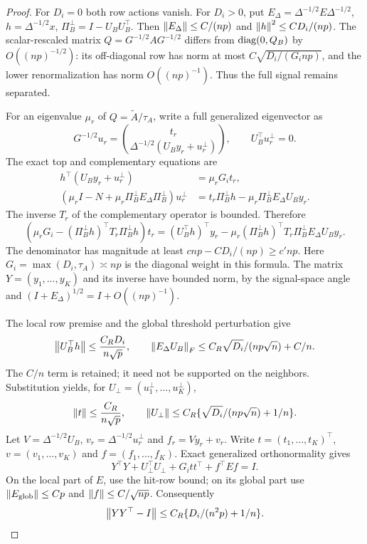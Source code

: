 \begin{proof}
For $D_i=0$ both row actions vanish. For $D_i>0$, put
$E_\Delta=\Delta^{-1/2}E\Delta^{-1/2}$, $h=\Delta^{-1/2}x$,
$\Pi_B^\perp=I-U_BU_B^\top$. Then $\left\lVert E_\Delta\right\rVert\le C/(np)$ and
$\left\lVert h\right\rVert^2\le CD_i/(np)$. The scalar-rescaled matrix $Q=G^{-1/2}AG^{-1/2}$ differs from
$\operatorname{diag}(0,Q_B)$ by $O({(np)}^{-1/2})$: its off-diagonal row has norm
at most $C\sqrt{D_i/(G_i{np})}$, and the lower renormalization has norm
$O({(np)}^{-1})$. Thus the full signal remains separated.

For an eigenvalue $\mu_r$ of $Q=\widetilde A/\tau_A$, write a full
generalized eigenvector as
\[
 G^{-1/2}u_r=\binom{t_r}{\Delta^{-1/2}(U_By_r+u_r^\perp)},
 \qquad U_B^\top u_r^\perp=0.
\]
The exact top and complementary equations are
\begin{align*}
 h^\top(U_By_r+u_r^\perp)&=\mu_r G_i t_r,\\
 (\mu_rI-N+\mu_r\Pi_B^\perp E_\Delta \Pi_B^\perp)u_r^\perp
   &=t_r\Pi_B^\perp h-\mu_r\Pi_B^\perp E_\Delta U_By_r.
\end{align*}
The inverse $T_r$ of the complementary operator is bounded. Therefore
\[
 (\mu_r G_i-(\Pi_B^\perp h)^\top T_r\Pi_B^\perp h)t_r
  =(U_B^\top h)^\top y_r
       -\mu_r(\Pi_B^\perp h)^\top T_r\Pi_B^\perp E_\Delta U_By_r.
\]
The denominator has magnitude at least $c{np}-CD_i/(np)\ge c'{np}$.
Here $G_i=\max(D_i,\tau_A)\asymp {np}$ is the diagonal weight in this formula.
The matrix $Y=(y_1,\ldots,y_K)$ and its inverse have bounded norm,
by the signal-space angle and $(I+E_\Delta)^{1/2}=I+O({(np)}^{-1})$.

The local row premise and the global threshold perturbation give
\[
 \left\lVert U_B^\top h\right\rVert\le \frac{C_RD_i}{n\sqrt p},\qquad
 \left\lVert E_\Delta U_B\right\rVert_F\le C_R\sqrt{D_i}/({np}\sqrt n)+C/n.
\]
The $C/n$ term is retained; it need not be supported on the neighbors.
Substitution yields, for $U_\perp=(u_1^\perp,\ldots,u_K^\perp)$,
\begin{equation}\label{restore:loo-refined}
 \left\lVert t\right\rVert\le \frac{C_R}{n\sqrt p},\qquad
 \left\lVert U_\perp\right\rVert\le C_R\{\sqrt{D_i}/({np}\sqrt n)+1/n\}.
\end{equation}
Let $V=\Delta^{-1/2}U_B$, $v_r=\Delta^{-1/2}u_r^\perp$ and
$f_r=Vy_r+v_r$. Write $t=(t_1,\ldots,t_K)^\top$, 
$v=(v_1,\ldots,v_K)$ and $f=(f_1,\ldots,f_K)$. Exact generalized orthonormality gives
\[
 Y^\top Y+U_\perp^\top U_\perp+G_i tt^\top+f^\top Ef=I.
\]
On the local part of $E$, use the hit-row bound; on its global part
use $\left\lVert E_\mathrm{glob}\right\rVert\le Cp$ and
$\left\lVert f\right\rVert\le C/\sqrt {np}$. Consequently
\begin{equation}\label{restore:loo-gram}
 \left\lVert YY^\top-I\right\rVert\le C_R\{D_i/({n^2p})+1/n\}.
\end{equation}


\end{proof}
